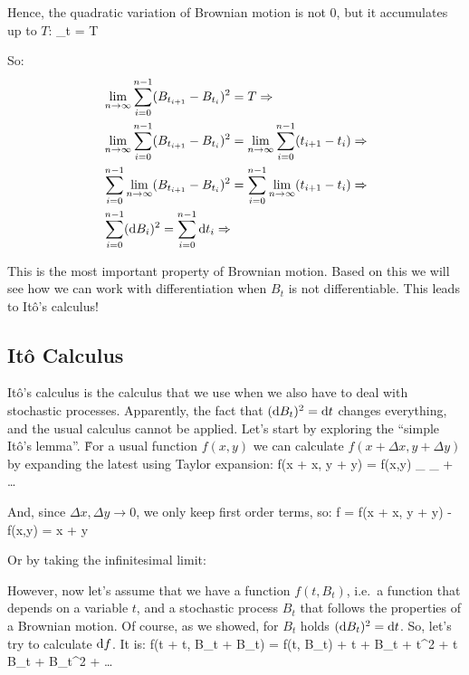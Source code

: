 Hence, the quadratic variation of Brownian motion is not 0, but it accumulates up to $T$:
\bse
[B]_{t} = T
\ese

So:
\begin{align*}
& \lim_{n \to \infty} \sum_{i=0}^{n-1} (B_{t_{i+1}} - B_{t_{i}})^{2} = T \Rightarrow \\
& \lim_{n \to \infty} \sum_{i=0}^{n-1} (B_{t_{i+1}} - B_{t_{i}})^{2} = \lim_{n \to \infty} \sum_{i=0}^{n-1} (t_{i+1} -
t_{i}) \Rightarrow \\
& \sum_{i=0}^{n-1} \lim_{n \to \infty} (B_{t_{i+1}} - B_{t_{i}})^{2} = \sum_{i=0}^{n-1} \lim_{n \to \infty} (t_{i+1} -
t_{i}) \Rightarrow \\
& \sum_{i=0}^{n-1} (\mathrm{d} B_{i})^{2} = \sum_{i=0}^{n-1} \mathrm{d} t_{i} \Rightarrow
\end{align*}
\bse
{}
\ese

This is the most important property of Brownian motion. Based on this we will see how we can work with
differentiation when $B_{t}$ is not differentiable. This leads to It\^o's calculus!

\subsection{It\^o Calculus}

It\^o's calculus is the calculus that we use when we also have to deal with stochastic processes. Apparently, the
fact that $(\mathrm{d} B_{t})^{2} = \mathrm{d} t$ changes everything, and the usual calculus cannot be applied. Let's start by
exploring the ``simple It\^o's lemma''. \v

For a usual function $f(x,y)$ we can calculate $f(x + \Delta x, y + \Delta y)$ by expanding the latest using Taylor
expansion:
\bse
f(x + \Delta x, y + \Delta y) = f(x,y)
_{}
_{} + \: \ldots
\ese

And, since $\Delta x, \Delta y \to 0$, we only keep first order terms, so:
\bse
\Delta f = f(x + \Delta x, y + \Delta y) - f(x,y) =  \Delta x +  \Delta y
\ese

Or by taking the infinitesimal limit:
\bse
{} \qquad {}
\ese

However, now let's assume that we have a function $f(t, B_{t})$, i.e.\ a function that depends on a variable $t$,
and a stochastic process $B_{t}$ that follows the properties of a Brownian motion. Of course, as we showed, for
$B_{t}$ holds $(\mathrm{d} B_{t})^{2} = \mathrm{d} t$. So, let's try to calculate $\mathrm{d} f$. It is:
\bse
f(t + \Delta t, B_{t} + \Delta B_{t}) = f(t, B_{t}) +  \Delta t +  \Delta B_{t}
+   \Delta t^{2} +  \Delta t \Delta B_{t} +
  \Delta B_{t}^{2} + \ldots
\ese

